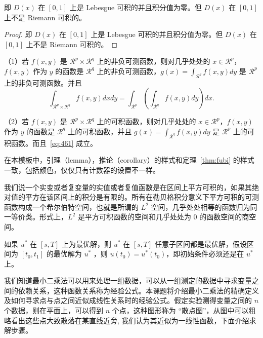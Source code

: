 \documentclass[lang=cn,newtx,10pt,scheme=chinese]{elegantbook}
\begin{document}
\begin{solution}
即 $D(x)$ 在 $[0,1]$ 上是 Lebesgue 可积的并且积分值为零。但 $D(x)$ 在 $[0,1]$ 上不是 Riemann 可积的。
\end{solution}

\begin{proof}
即 $D(x)$ 在 $[0,1]$ 上是 Lebesgue 可积的并且积分值为零。但 $D(x)$ 在 $[0,1]$ 上不是 Riemann 可积的。
\end{proof}

\begin{theorem}[Fubini 定理] \label{thm:fubi} 
（1）若 $f(x,y)$ 是 $\mathcal{R}^p\times\mathcal{R}^q$ 上的非负可测函数，则对几乎处处的 $x\in \mathcal{R}^p$，$f(x,y)$ 作为 $y$ 的函数是 $\mathcal{R}^q$ 上的非负可测函数，$g(x)=\int_{\mathcal{R}^q}f(x,y) dy$ 是 $\mathcal{R}^p$ 上的非负可测函数。并且
\begin{equation}
   \label{eq:461}
   \int_{\mathcal{R}^p\times\mathcal{R}^q} f(x,y) dxdy=\int_{\mathcal{R}^p}\left(\int_{\mathcal{R}^q}f(x,y)dy\right)dx.
\end{equation}

（2）若 $f(x,y)$ 是 $\mathcal{R}^p\times\mathcal{R}^q$ 上的可积函数，则对几乎处处的 $x\in\mathcal{R}^p$，$f(x,y)$ 作为 $y$ 的函数是 $\mathcal{R}^q$ 上的可积函数，并且 $g(x)=\int_{\mathcal{R}^q}f(x,y) dy$ 是 $\mathcal{R}^p$ 上的可积函数。而且~\eqref{eq:461} 成立。
\end{theorem}

\begin{note}
在本模板中，引理（lemma），推论（corollary）的样式和定理~\ref{thm:fubi} 的样式一致，包括颜色，仅仅只有计数器的设置不一样。
\end{note}

我们说一个实变或者复变量的实值或者复值函数是在区间上平方可积的，如果其绝对值的平方在该区间上的积分是有限的。所有在勒贝格积分意义下平方可积的可测函数构成一个希尔伯特空间，也就是所谓的 $L^2$ 空间，几乎处处相等的函数归为同一等价类。形式上，$L^2$ 是平方可积函数的空间和几乎处处为 0 的函数空间的商空间。

\begin{proposition}[最优性原理] \label{pro:max}
如果 $u^*$ 在 $[s,T]$ 上为最优解，则 $u^*$ 在 $[s, T]$ 任意子区间都是最优解，假设区间为 $[t_0, t_1]$ 的最优解为 $u^*$ ，则 $u(t_0)=u^{*}(t_0)$，即初始条件必须还是在 $u^*$ 上。
\end{proposition}

我们知道最小二乘法可以用来处理一组数据，可以从一组测定的数据中寻求变量之间的依赖关系，这种函数关系称为经验公式。本课题将介绍最小二乘法的精确定义及如何寻求点与点之间近似成线性关系时的经验公式。假定实验测得变量之间的 $n$ 个数据，则在平面上，可以得到 $n$ 个点，这种图形称为 “散点图”，从图中可以粗略看出这些点大致散落在某直线近旁, 我们认为其近似为一线性函数，下面介绍求解步骤。
\end{document}
